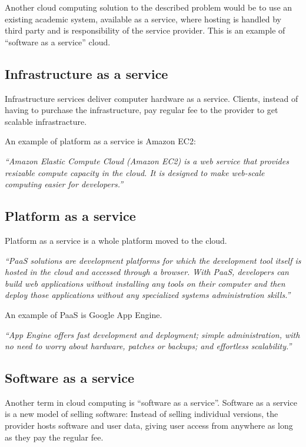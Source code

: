 Another cloud computing solution to the described problem would be to use an existing academic system, available as a service, where hosting is handled by third party and is responsibility of the service provider. This is an example of ``software as a service'' cloud. \citep{cloud_book}

\subsection{Infrastructure as a service}

Infrastructure services deliver computer hardware as a service. Clients, instead of having to purchase the infrastructure, pay regular fee to the provider to get scalable infrastracture.

An example of platform as a service is Amazon EC2:

\emph{``Amazon Elastic Compute Cloud (Amazon EC2) is a web service that provides resizable compute capacity in the cloud. It is designed to make web-scale computing easier for developers.''} \citep{amazon}

\subsection{Platform as a service}

Platform as a service is a whole platform moved to the cloud. 

\emph{``PaaS solutions are development platforms for which the development tool itself is hosted in the cloud and accessed through a browser. With PaaS, developers can build web applications without installing any tools on their computer and then deploy those applications without any specialized systems administration skills.''} \citep{paas}

An example of PaaS is Google App Engine.

\emph{``App Engine offers fast development and deployment; simple administration, with no need to worry about hardware, patches or backups; and effortless scalability.''} \citep{google_appengine}

\subsection{Software as a service}

Another term in cloud computing is ``software as a service''. Software as a service is a new model of selling software: Instead of selling individual versions, the provider hosts software and user data, giving user access from anywhere as long as they pay the regular fee. \citep{cloud_book}